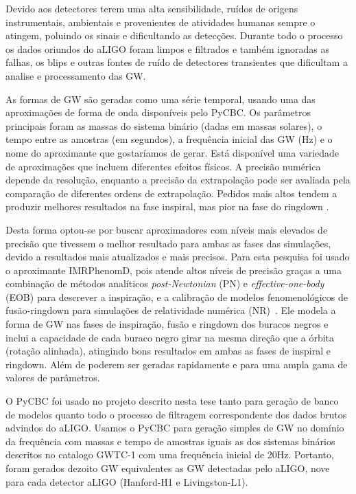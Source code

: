 Devido aos detectores terem uma alta sensibilidade, ruídos de origens instrumentais, ambientais e provenientes de atividades humanas sempre o atingem, poluindo os sinais e dificultando as detecções. Durante todo o processo os dados oriundos do aLIGO foram limpos e filtrados e também ignoradas as falhas, os blips e outras fontes de ruído de detectores transientes que dificultam a analise e processamento das GW.

As formas de GW são geradas como uma série temporal, usando uma das aproximações de forma de onda disponíveis pelo PyCBC. Os parâmetros principais foram as massas do sistema binário (dadas em massas solares), o tempo entre as amostras (em segundos), a frequência inicial das GW (Hz) e o nome do aproximante que gostaríamos de gerar. Está disponível uma variedade de aproximações que incluem diferentes efeitos físicos. A precisão numérica depende da resolução, enquanto a precisão da extrapolação pode ser avaliada pela comparação de diferentes ordens de extrapolação. Pedidos mais altos tendem a produzir melhores resultados na fase inspiral, mas pior na fase do ringdown \cite{scharpf2017simulation}. 

Desta forma optou-se por buscar aproximadores com níveis mais elevados de precisão que tivessem o melhor resultado para ambas as fases das simulações, devido a resultados mais atualizados e mais precisos. Para esta pesquisa foi usado o aproximante IMRPhenomD, pois atende altos níveis de precisão graças a uma combinação de métodos analíticos \textit{post-Newtonian} (PN) e \textit{effective-one-body} (EOB) para descrever a inspiração, e a calibração de modelos fenomenológicos de fusão-ringdown para simulações de relatividade numérica (NR)~\cite{khan2015frequencydomain}. Ele modela a forma de GW nas fases de inspiração, fusão e ringdown dos buracos negros e inclui a capacidade de cada buraco negro girar na mesma direção que a órbita (rotação alinhada), atingindo bons resultados em ambas as fases de inspiral e ringdown. Além de poderem ser geradas rapidamente e para uma ampla gama de valores de parâmetros.

O PyCBC foi usado no projeto descrito nesta tese tanto para geração de banco de modelos quanto todo o processo de filtragem correspondente dos dados brutos advindos do aLIGO. Usamos o PyCBC para geração simples de GW no domínio da frequência com massas e tempo de amostras iguais as dos sistemas binários descritos no catalogo GWTC-1 com uma frequência inicial de 20Hz. Portanto, foram gerados dezoito GW equivalentes as GW detectadas pelo aLIGO, nove para cada detector aLIGO (Hanford-H1 e Livingston-L1).

